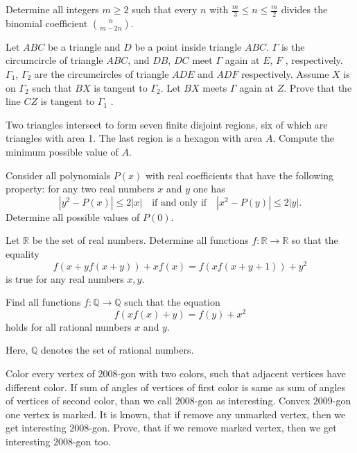 \documentclass[11pt]{scrartcl}
\begin{document}
\begin{problem}[745968391440822]
Determine all integers $m \geq 2$ such that every $n$ with $\frac{m}{3} \leq n \leq \frac{m}{2}$ divides the binomial coefficient $\binom{n}{m-2n}$.
\end{problem}
\begin{problem}[6209707374283278028]
Let $ABC$ be a triangle and $D$ be a point inside triangle $ABC$. $\Gamma$ is the circumcircle of triangle $ABC$, and $DB$, $DC$ meet $\Gamma$ again at $E$, $F$ , respectively. $\Gamma_1$, $\Gamma_2$ are the circumcircles of triangle $ADE$ and $ADF$ respectively. Assume $X$ is on $\Gamma_2$ such that $BX$ is tangent to $\Gamma_2$. Let $BX$ meets $\Gamma$ again at $Z$. Prove that the line $CZ$ is tangent to $\Gamma_1$ .
\end{problem}
\begin{problem}[1580707630770476037]
Two triangles intersect to form seven finite disjoint regions, six of which are triangles with area 1. The last region is a hexagon with area \(A\). Compute the minimum possible value of \(A\).
\end{problem}
\begin{problem}[861953008482666]
Consider all polynomials $P(x)$ with real coefficients that have the following property: for any two real numbers $x$ and $y$ one has\[|y^2-P(x)|\le 2|x|\quad\text{if and only if}\quad |x^2-P(y)|\le 2|y|.\]Determine all possible values of $P(0)$.
\end{problem}
\begin{problem}[827629029640194]
Let $\mathbb{R}$ be the set of real numbers. Determine all functions $f: \mathbb{R}\longrightarrow \mathbb{R}$ so that the equality$$f(x+yf(x+y)) +xf(x)= f(xf(x+y+1))+y^2$$is true for any real numbers $x,y$.
\end{problem}
\begin{problem}[891406366009347]
Find all functions $f:\mathbb{Q}\to\mathbb{Q}$ such that the equation
\[f(xf(x)+y) = f(y) + x^2\]holds for all rational numbers $x$ and $y$.

Here, $\mathbb{Q}$ denotes the set of rational numbers.
\end{problem}
\begin{problem}[8757490679465390171]
	Color every vertex of $2008$-gon with two colors, such that adjacent vertices have different color. If sum of angles of vertices of first color is same as sum of angles of vertices of second color, than we call $2008$-gon as interesting.
Convex $2009$-gon one vertex is marked. It is known, that if remove any unmarked vertex, then we get interesting $2008$-gon. Prove, that if we remove marked vertex, then we get interesting $2008$-gon too.
\end{problem}
\end{document}
